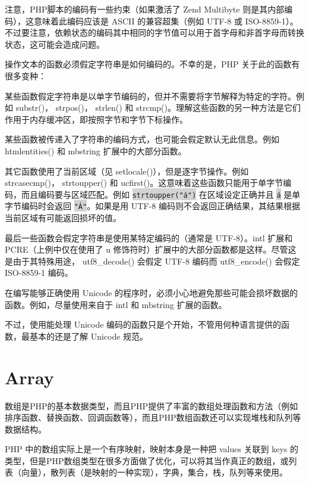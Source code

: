 注意，PHP脚本的编码有一些约束（如果激活了 Zend Multibyte 则是其内部编码），这意味着此编码应该是 ASCII 的兼容超集（例如 UTF-8 或 ISO-8859-1）。不过要注意，依赖状态的编码其中相同的字节值可以用于首字母和非首字母而转换状态，这可能会造成问题。

操作文本的函数必须假定字符串是如何编码的。不幸的是，PHP 关于此的函数有很多变种：

\begin{compactitem}
\item 某些函数假定字符串是以单字节编码的，但并不需要将字节解释为特定的字符。例如 substr()， strpos()， strlen() 和 strcmp()。理解这些函数的另一种方法是它们作用于内存缓冲区，即按照字节和字节下标操作。
\item 某些函数被传递入了字符串的编码方式，也可能会假定默认无此信息。例如 htmlentities() 和 mbstring 扩展中的大部分函数。
\item 其它函数使用了当前区域（见 setlocale()），但是逐字节操作。例如 strcasecmp()， strtoupper() 和 ucfirst()。这意味着这些函数只能用于单字节编码，而且编码要与区域匹配。例如 \colorbox{lightgray}{\texttt{strtoupper("á")}} 在区域设定正确并且 \colorbox{lightgray}{\texttt{á}} 是单字节编码时会返回 \colorbox{lightgray}{\texttt{"Á"}}。如果是用 UTF-8 编码则不会返回正确结果，其结果根据当前区域有可能返回损坏的值。
\item 最后一些函数会假定字符串是使用某特定编码的（通常是 UTF-8）。intl 扩展和 PCRE（上例中仅在使用了 u 修饰符时）扩展中的大部分函数都是这样。尽管这是由于其特殊用途， utf8\_decode() 会假定 UTF-8 编码而 utf8\_encode() 会假定 ISO-8859-1 编码。
\end{compactitem}

在编写能够正确使用 Unicode 的程序时，必须小心地避免那些可能会损坏数据的函数。例如，尽量使用来自于 intl 和 mbstring 扩展的函数。

不过，使用能处理 Unicode 编码的函数只是个开始，不管用何种语言提供的函数，最基本的还是了解 Unicode 规范。



\section{Array}

数组是PHP的基本数据类型，而且PHP提供了丰富的数组处理函数和方法（例如排序函数、替换函数、回调函数等），而且PHP数组函数还可以实现堆栈和队列等数据结构。

PHP 中的数组实际上是一个有序映射，映射本身是一种把 values 关联到 keys 的类型，但是PHP数组类型在很多方面做了优化，可以将其当作真正的数组，或列表（向量），散列表（是映射的一种实现），字典，集合，栈，队列等来使用。


